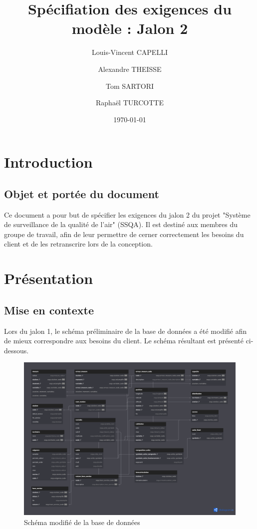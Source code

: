 \documentclass{article}
\begin{document}
\title{Spécifiation des exigences du modèle : Jalon 2}

\author{Louis-Vincent CAPELLI \and Alexandre THEISSE \and Tom SARTORI \and Raphaël TURCOTTE}
\date{\today}
\maketitle
\newpage

\tableofcontents
\newpage

\section{Introduction}
\subsection*{Objet et portée du document}
Ce document a pour but de spécifier les exigences du jalon 2 du projet "Système
de surveillance de la qualité de l'air" (SSQA). Il est destiné aux membres du 
groupe de travail, afin de leur permettre de cerner correctement les besoins
du client et de les retranscrire lors de la conception.

\section{Présentation}
\subsection{Mise en contexte}
Lors du jalon 1, le schéma préliminaire de la base de données a été
modifié afin de mieux correspondre aux besoins du client. Le schéma résultant
est présenté ci-dessous.

\begin{figure}[h]
\centering
\includegraphics[scale=0.24]{modif.png}
\caption{Schéma modifié de la base de données}
\end{figure}
\end{document}
